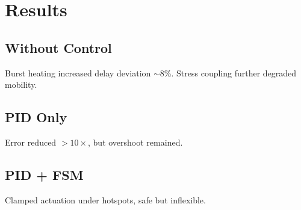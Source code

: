 \documentclass[conference]{IEEEtran}
\begin{document}
\section{Results}
\subsection{Without Control}
Burst heating increased delay deviation $\sim$8\%. Stress coupling further degraded mobility.  
\subsection{PID Only}
Error reduced $>10\times$, but overshoot remained.  
\subsection{PID + FSM}
Clamped actuation under hotspots, safe but inflexible.  
\end{document}
